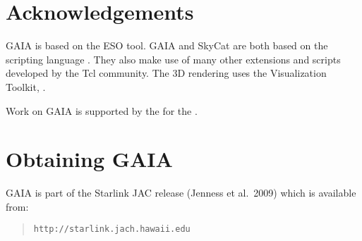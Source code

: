 \documentclass[11pt,twoside]{article}  %
\begin{document}
\section{Acknowledgements}
GAIA is based on the ESO
 tool.
GAIA and SkyCat are both based on the scripting language
.
They also make use of many other extensions and scripts developed by the Tcl
community. The 3D rendering uses the Visualization Toolkit,
. 

Work on GAIA is supported by the 
for the 
.

\section{Obtaining GAIA}

GAIA is part of the Starlink JAC release (Jenness et al.\ 2009) which is
available from:
\begin{quote}
\begin{verbatim}
http://starlink.jach.hawaii.edu
\end{verbatim}
\end{quote}
\end{document}
